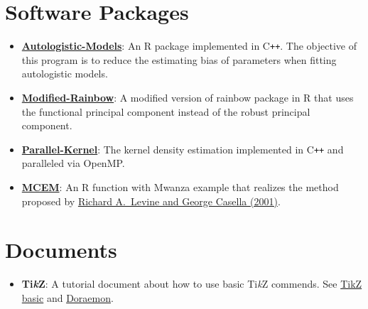 \documentclass[a4paper,10pt,dvipdfmx]{article}
\begin{document}
\section*{Software Packages}
\begin{itemize}[noitemsep,nolistsep]
  \item \href{https://github.com/Chris7462/Autologistic-Models}{\textbf{Autologistic-Models}}: An \textsf{R} package implemented in \textsf{C}\texttt{++}. The objective of this program is to reduce the estimating bias of parameters when fitting autologistic models.
  \item \href{https://github.com/Chris7462/Modified-Rainbow}{\textbf{Modified-Rainbow}}: A modified version of rainbow package in \textsf{R} that uses the functional principal component instead of the robust principal component.
  \item \href{https://github.com/Chris7462/Parallel-Kernel}{\textbf{Parallel-Kernel}}: The kernel density estimation implemented in \textsf{C}\texttt{++} and paralleled via OpenMP.
  \item \href{https://github.com/Chris7462/Monte-Carlo-EM-Algorithm}{\textbf{MCEM}}: An \textsf{R} function with Mwanza example that realizes the method proposed by \href{https://www.jstor.org/stable/1391097}{Richard A.~Levine and George Casella (2001)}.
\end{itemize}

\section*{Documents}
\begin{itemize}[noitemsep,nolistsep]
  \item \textbf{Ti\textit{k}Z}: A tutorial document about how to use basic Ti\textit{k}Z commends. See \href{https://github.com/Chris7462/TikZ/blob/master/TikZ_basic.pdf}{TikZ basic} and \href{https://github.com/Chris7462/TikZ/blob/master/Examples/Doraemon.pdf}{Doraemon}.
\end{itemize}
\end{document}
